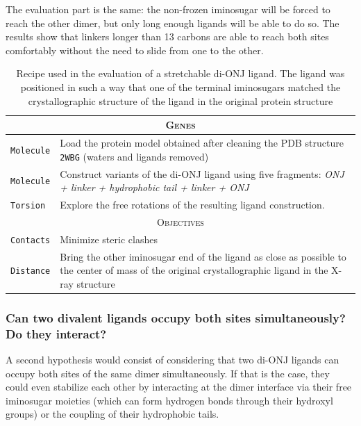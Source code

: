 The evaluation part is the same: the non-frozen iminosugar will be forced to reach the other dimer, but only long enough ligands will be able to do so. The results show that linkers longer than 13 carbons are able to reach both sites comfortably without the need to slide from one to the other.


\begin{table}[hbtp]
	\caption[Stretchable di-ONJ recipe]{Recipe used in the evaluation of a stretchable di-ONJ ligand. The ligand was positioned in such a way that one of the terminal iminosugars matched the crystallographic structure of the ligand in the original protein structure\cite{pdb:2wbg}}
	\label{table:recipe-single-divalent}
	\footnotesize
	\newcommand{\tableheading}[1]{\multicolumn{2}{c}{\textsc{#1}}}
	\begin{tabularx}{\textwidth}{RL}
		\toprule
		\tableheading{Genes}\\
		\toprule
		\texttt{Molecule} & Load the protein model obtained after cleaning the PDB structure \texttt{2WBG} (waters and ligands removed) \\
		\midrule
		\texttt{Molecule} & Construct variants of the di-ONJ ligand using five fragments: \textit{ONJ + linker + hydrophobic tail + linker + ONJ}\\
		\midrule
		\texttt{Torsion} & Explore the free rotations of the resulting ligand construction. \\
		\toprule
		\tableheading{Objectives}\\
		\toprule
		\texttt{Contacts} & Minimize steric clashes \\
		\midrule
		\texttt{Distance} & Bring the other iminosugar end of the ligand as close as possible to the center of mass of the original crystallographic ligand in the X-ray structure\cite{pdb:2wbg} \\

		\bottomrule

	\end{tabularx}
\end{table}

\subsubsection{Can two divalent ligands occupy both sites simultaneously? Do they interact?}
A second hypothesis would consist of considering that two di-ONJ ligands can occupy both sites of the same dimer simultaneously. If that is the case, they could even stabilize each other by interacting at the dimer interface via their free iminosugar moieties (which can form hydrogen bonds through their hydroxyl groups) or the coupling of their hydrophobic tails.

